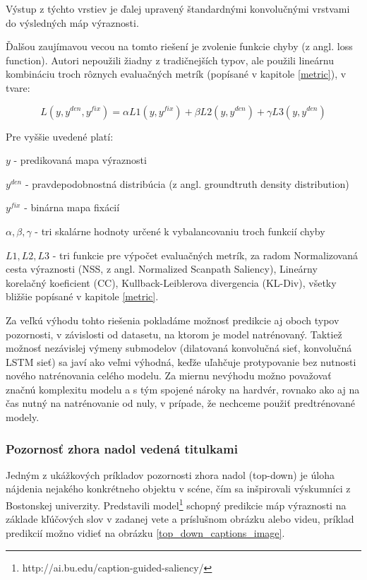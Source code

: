 Výstup z týchto vrstiev je ďalej upravený štandardnými konvolučnými vrstvami do výsledných máp výraznosti.

Ďalšou zaujímavou vecou na tomto riešení je zvolenie funkcie chyby (z angl. loss function). Autori nepoužili žiadny z tradičnejších typov, ale použili lineárnu kombináciu troch rôznych evaluačných metrík (popísané v kapitole \ref{metric}), v tvare:

\begin{equation}
	L (y, y^{den}, y^{fix}) = \alpha L1(y, y^{fix}) + \beta L2(y, y^{den}) + \gamma L3(y, y^{den})
\end{equation}

Pre vyššie uvedené platí:

$y$ - predikovaná mapa výraznosti

$y^{den}$ - pravdepodobnostná distribúcia (z angl. groundtruth density distribution)

$y^{fix}$ - binárna mapa fixácií

$\alpha, \beta, \gamma $ - tri skalárne hodnoty určené k vybalancovaniu troch funkcií chyby

$L1, L2, L3$ - tri funkcie pre výpočet evaluačných metrík, za radom Normalizovaná cesta výraznosti (NSS, z angl. Normalized Scanpath Saliency), Lineárny korelačný koeficient (CC), Kullback-Leiblerova divergencia (KL-Div), všetky bližšie popísané v kapitole \ref{metric}.

Za veľkú výhodu tohto riešenia pokladáme možnosť predikcie aj oboch typov pozornosti, v závislosti od datasetu, na ktorom je model natrénovaný. Taktiež možnosť nezávislej výmeny submodelov (dilatovaná konvolučná sieť,  konvolučná LSTM sieť) sa javí ako veľmi výhodná, keďže uľahčuje protypovanie bez nutnosti nového natrénovania celého modelu. Za miernu nevýhodu možno považovať značnú komplexitu modelu a s tým spojené nároky na hardvér, rovnako ako aj na čas nutný na natrénovanie od nuly, v prípade, že nechceme použiť predtrénované modely. 

\subsubsection{Pozornosť zhora nadol vedená titulkami}
\label{caption_model}
Jedným z ukážkových príkladov pozornosti zhora nadol (top-down) je úloha nájdenia nejakého konkrétneho objektu v scéne, čím sa inšpirovali výskumníci z Bostonskej univerzity. Predstavili model\footnote{http://ai.bu.edu/caption-guided-saliency/} \cite{ramanishka2017top} schopný predikcie máp výraznosti na základe kľúčových slov v zadanej vete a príslušnom obrázku alebo videu, príklad predikcií možno vidieť na obrázku \ref{top_down_captions_image}.

